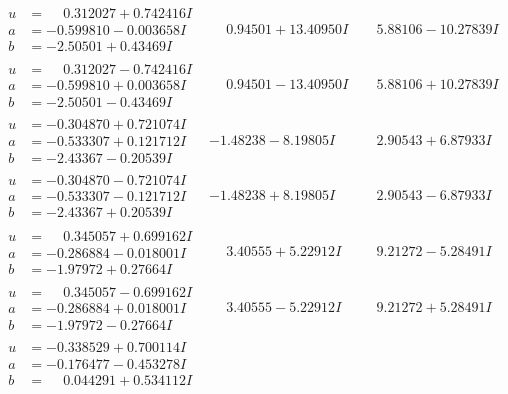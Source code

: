 \documentclass[1p]{elsarticle_modified}
\theoremstyle{definition}
\begin{document}
$$\begin{array}{c|c|c}
\begin{aligned}
u &= \phantom{-}0.312027 + 0.742416 I \\
a &= -0.599810 - 0.003658 I \\
b &= -2.50501 + 0.43469 I\end{aligned}
 & \phantom{-}0.94501 + 13.40950 I & \phantom{-}5.88106 - 10.27839 I \\ \hline\begin{aligned}
u &= \phantom{-}0.312027 - 0.742416 I \\
a &= -0.599810 + 0.003658 I \\
b &= -2.50501 - 0.43469 I\end{aligned}
 & \phantom{-}0.94501 - 13.40950 I & \phantom{-}5.88106 + 10.27839 I \\ \hline\begin{aligned}
u &= -0.304870 + 0.721074 I \\
a &= -0.533307 + 0.121712 I \\
b &= -2.43367 - 0.20539 I\end{aligned}
 & -1.48238 - 8.19805 I & \phantom{-}2.90543 + 6.87933 I \\ \hline\begin{aligned}
u &= -0.304870 - 0.721074 I \\
a &= -0.533307 - 0.121712 I \\
b &= -2.43367 + 0.20539 I\end{aligned}
 & -1.48238 + 8.19805 I & \phantom{-}2.90543 - 6.87933 I \\ \hline\begin{aligned}
u &= \phantom{-}0.345057 + 0.699162 I \\
a &= -0.286884 - 0.018001 I \\
b &= -1.97972 + 0.27664 I\end{aligned}
 & \phantom{-}3.40555 + 5.22912 I & \phantom{-}9.21272 - 5.28491 I \\ \hline\begin{aligned}
u &= \phantom{-}0.345057 - 0.699162 I \\
a &= -0.286884 + 0.018001 I \\
b &= -1.97972 - 0.27664 I\end{aligned}
 & \phantom{-}3.40555 - 5.22912 I & \phantom{-}9.21272 + 5.28491 I \\ \hline\begin{aligned}
u &= -0.338529 + 0.700114 I \\
a &= -0.176477 - 0.453278 I \\
b &= \phantom{-}0.044291 + 0.534112 I\end{aligned}

\end{array}$$
\end{document}
